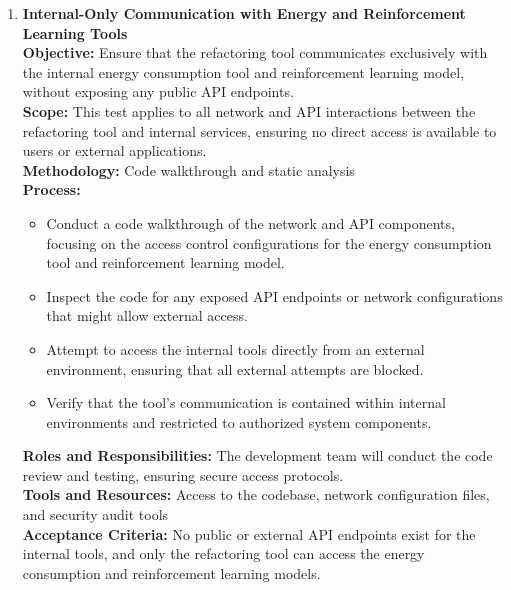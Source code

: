 \documentclass[12pt, titlepage]{article}
\begin{document}
\begin{enumerate}[label={\bf \textcolor{Maroon}{test-SRT-\arabic*}}, wide=0pt, font=\itshape]
  \item \textbf{Internal-Only Communication with Energy and Reinforcement Learning Tools} \\[2mm]
    \textbf{Objective:} Ensure that the refactoring tool communicates exclusively with the internal energy consumption tool and reinforcement learning model, without exposing any public API endpoints. \\[2mm]
    \textbf{Scope:} This test applies to all network and API interactions between the refactoring tool and internal services, ensuring no direct access is available to users or external applications. \\[2mm]
    \textbf{Methodology:} Code walkthrough and static analysis \\[2mm]
    \textbf{Process:}
    \begin{itemize}
      \item Conduct a code walkthrough of the network and API components, focusing on the access control configurations for the energy consumption tool and reinforcement learning model.
      \item Inspect the code for any exposed API endpoints or network configurations that might allow external access.
      \item Attempt to access the internal tools directly from an external environment, ensuring that all external attempts are blocked.
      \item Verify that the tool’s communication is contained within internal environments and restricted to authorized system components.
    \end{itemize}
    \textbf{Roles and Responsibilities:} The development team will conduct the code review and testing, ensuring secure access protocols. \\[2mm]
    \textbf{Tools and Resources:} Access to the codebase, network configuration files, and security audit tools \\[2mm]
    \textbf{Acceptance Criteria:} No public or external API endpoints exist for the internal tools, and only the refactoring tool can access the energy consumption and reinforcement learning models.
  

\end{enumerate}
\end{document}
